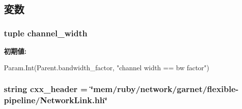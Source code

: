 \subsection{変数}
\hypertarget{classGarnetLink_1_1NetworkLink_a1129edba1db6bd1f0c3d1ddda4be3d9d}{
\subsubsection[{channel\_\-width}]{\setlength{\rightskip}{0pt plus 5cm}tuple {\bf channel\_\-width}}}
\label{classGarnetLink_1_1NetworkLink_a1129edba1db6bd1f0c3d1ddda4be3d9d}
{\bfseries 初期値:}
\begin{DoxyCode}
Param.Int(Parent.bandwidth_factor,
                              "channel width == bw factor")
\end{DoxyCode}
\hypertarget{classGarnetLink_1_1NetworkLink_a17da7064bc5c518791f0c891eff05fda}{
\subsubsection[{cxx\_\-header}]{\setlength{\rightskip}{0pt plus 5cm}string {\bf cxx\_\-header} = \char`\"{}mem/ruby/network/garnet/flexible-\/pipeline/NetworkLink.hh\char`\"{}}}
\label{classGarnetLink_1_1NetworkLink_a17da7064bc5c518791f0c891eff05fda}


